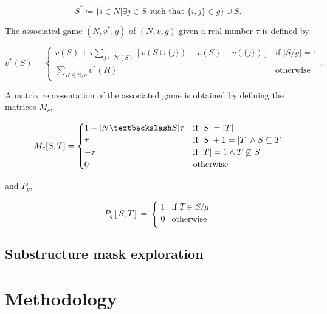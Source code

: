 \documentclass[twoside,twocolumn,9pt]{article}
\begin{document}
\begin{equation}
    S^* \coloneqq \{ i \in N | \exists j \in S \text{ such that } \{i, j\} \in g \} \cup S.
\end{equation}

The associated game $(N, v^*, g)$ of $(N, v, g)$ given a real number $\tau$ is defined by 

\begin{equation}
    v^*(S) = 
    \begin{cases}
        v(S) + \tau \sum_{j \in \mathcal{N}(S)} \left[ v(S \cup \{j\}) - v(S) - v(\{j\}) \right]  & \text{if } |S/g| = 1 \\
        \sum_{R \in S/g} v^*(R) &  \text{otherwise}
    \end{cases}
    .
\end{equation}

A matrix representation of the associated game is obtained by defining the matrices $M_c$, 

\begin{equation}
    M_c[S, T] = 
    \begin{cases} 
        1 - |N \textbackslash S| \tau & \text{if } |S| = |T| \\
        \tau & \text{if } |S| + 1 = |T| \land S \subseteq T \\
        -\tau & \text{if } |T| = 1  \land T \not \subseteq S \\
        0 & \text{otherwise}
    \end{cases}
\end{equation}

and $P_g$,

\begin{equation}
    P_g[S, T] = 
    \begin{cases} 
        1 & \text{if } T \in S/g \\
        0 & \text{otherwise} \\
    \end{cases}
\end{equation}

\subsection{Substructure mask exploration}







\section{Methodology}
\end{document}
